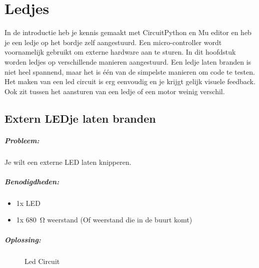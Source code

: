 \chapter{Ledjes}\label{chap:ledjes}
In de introductie heb je kennis gemaakt met CircuitPython en Mu editor en heb je een ledje op het bordje zelf aangestuurd. Een micro-controller wordt voornamelijk gebruikt om externe hardware aan te sturen. In dit hoofdstuk worden ledjes op verschillende manieren aangestuurd. Een ledje laten branden is niet heel spannend, maar het is \'e\'en van de simpelste manieren om code te testen. Het maken van een led circuit is erg eenvoudig en je krijgt gelijk visuele feedback. Ook zit tussen het aansturen van een ledje of een motor weinig verschil.

\newpage
\section{Extern LEDje laten branden}\label{sec:ledExtern}
	\paragraph{Probleem:} Je wilt een externe LED laten knipperen.
	\paragraph{Benodigdheden:}
	\begin{itemize}
		\item 1x LED
		\item 1x \SI{680}{\ohm} weerstand (Of weerstand die in de buurt komt)
	\end{itemize}
	\paragraph{Oplossing:}
		\begin{figure}[H]
			\caption{Led Circuit}
			\label{fig:LED}
		\end{figure}
		

